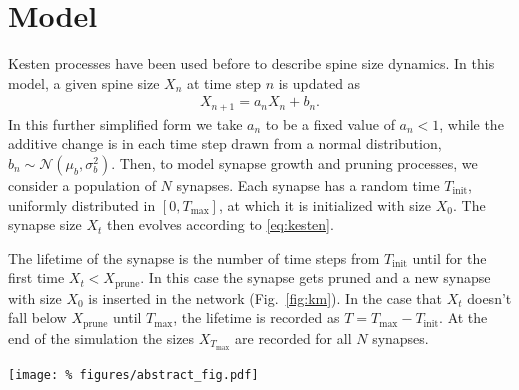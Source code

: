 
\vspace{-0.4cm}
\section*{Model}

Kesten processes have been used before \cite{Statman2014} to describe spine size dynamics. In this model, a given spine size $X_n$ at time step $n$ is updated as
%
\begin{align}
  X_{n+1} = a_n X_n + b_n. \label{eq:kesten}
\end{align}
%
In this further simplified form we take $a_n$ to be a fixed value of $a_n < 1$, while the additive change is in each time step drawn from a normal distribution, $b_n \sim \mathcal{N}(\mu_b, \sigma_b^2)$. Then, to model synapse growth and pruning processes, we consider a population of $N$ synapses. Each synapse has a random time $T_{\mathrm{init}}$, uniformly distributed in $[0,T_{\text{max}}]$, at which it is initialized with size $X_0$. The synapse size $X_t$ then evolves according to \eqref{eq:kesten}.

\medskip

The lifetime of the synapse is the number of time steps from $T_{\text{init}}$ until for the first time $X_t < X_{\mathrm{prune}}$. In this case the synapse gets pruned and a new synapse with size $X_0$ is inserted in the network (Fig.~\ref{fig:km}). In the case that $X_t$ doesn't fall below $X_{\mathrm{prune}}$ until $T_{\text{max}}$, the lifetime is recorded as $T=T_{\text{max}}-T_{\text{init}}$. At the end of the simulation the sizes $X_{T_{\text{max}}}$ are recorded for all $N$ synapses.

\begin{center}\vspace{1cm}
  \texttt{[image: \%
    figures/abstract\_fig.pdf]}
  \label{fig:km}
\end{center}\vspace{1.4cm}


